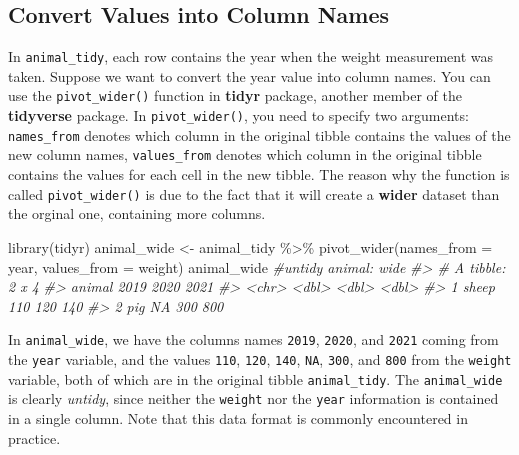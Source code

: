 \documentclass[
]{book}
\newenvironment{Shaded}{\begin{snugshade}}{\end{snugshade}}
\newcommand{\AttributeTok}[1]{\textcolor[rgb]{0.77,0.63,0.00}{#1}}
\newcommand{\CommentTok}[1]{\textcolor[rgb]{0.56,0.35,0.01}{\textit{#1}}}
\newcommand{\FunctionTok}[1]{\textcolor[rgb]{0.00,0.00,0.00}{#1}}
\newcommand{\NormalTok}[1]{#1}
\newcommand{\OtherTok}[1]{\textcolor[rgb]{0.56,0.35,0.01}{#1}}
\newcommand{\SpecialCharTok}[1]{\textcolor[rgb]{0.00,0.00,0.00}{#1}}
\begin{document}
\hypertarget{tidy-wide}{%
\subsection{Convert Values into Column Names}\label{tidy-wide}}

In \texttt{animal\_tidy}, each row contains the year when the weight measurement was taken. Suppose we want to convert the year value into column names. You can use the \texttt{pivot\_wider()} function in \textbf{tidyr} package, another member of the \textbf{tidyverse} package. In \texttt{pivot\_wider()}, you need to specify two arguments: \texttt{names\_from} denotes which column in the original tibble contains the values of the new column names, \texttt{values\_from} denotes which column in the original tibble contains the values for each cell in the new tibble. The reason why the function is called \texttt{pivot\_wider()} is due to the fact that it will create a \textbf{wider} dataset than the orginal one, containing more columns.

\begin{Shaded}
\begin{Highlighting}[]
\FunctionTok{library}\NormalTok{(tidyr)}
\NormalTok{animal\_wide }\OtherTok{\textless{}{-}}\NormalTok{ animal\_tidy }\SpecialCharTok{\%\textgreater{}\%} \FunctionTok{pivot\_wider}\NormalTok{(}\AttributeTok{names\_from =}\NormalTok{ year,                                  }\AttributeTok{values\_from =}\NormalTok{ weight) }
\NormalTok{animal\_wide   }\CommentTok{\#untidy animal: wide}
\CommentTok{\#\textgreater{} \# A tibble: 2 x 4}
\CommentTok{\#\textgreater{}   animal \textasciigrave{}2019\textasciigrave{} \textasciigrave{}2020\textasciigrave{} \textasciigrave{}2021\textasciigrave{}}
\CommentTok{\#\textgreater{}   \textless{}chr\textgreater{}   \textless{}dbl\textgreater{}  \textless{}dbl\textgreater{}  \textless{}dbl\textgreater{}}
\CommentTok{\#\textgreater{} 1 sheep     110    120    140}
\CommentTok{\#\textgreater{} 2 pig        NA    300    800}
\end{Highlighting}
\end{Shaded}

In \texttt{animal\_wide}, we have the columns names \texttt{2019}, \texttt{2020}, and \texttt{2021} coming from the \texttt{year} variable, and the values \texttt{110}, \texttt{120}, \texttt{140}, \texttt{NA}, \texttt{300}, and \texttt{800} from the \texttt{weight} variable, both of which are in the original tibble \texttt{animal\_tidy}. The \texttt{animal\_wide} is clearly \emph{untidy}, since neither the \texttt{weight} nor the \texttt{year} information is contained in a single column. Note that this data format is commonly encountered in practice.
\end{document}
